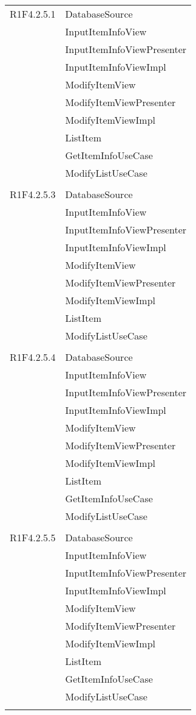 \begin{center}
\begin{longtable}{|p{7cm}|p{7cm}|}
		R1F4.2.5.1 & DatabaseSource \\ & InputItemInfoView \\ & InputItemInfoViewPresenter \\ & InputItemInfoViewImpl \\ & ModifyItemView \\ & ModifyItemViewPresenter \\ & ModifyItemViewImpl \\ & ListItem \\ & GetItemInfoUseCase \\ & ModifyListUseCase \\ & \\ \hline
		R1F4.2.5.3 & DatabaseSource \\ & InputItemInfoView \\ & InputItemInfoViewPresenter \\ & InputItemInfoViewImpl \\ & ModifyItemView \\ & ModifyItemViewPresenter \\ & ModifyItemViewImpl \\ & ListItem \\ & ModifyListUseCase \\ & \\ \hline
		R1F4.2.5.4 & DatabaseSource \\ & InputItemInfoView \\ & InputItemInfoViewPresenter \\ & InputItemInfoViewImpl \\ & ModifyItemView \\ & ModifyItemViewPresenter \\ & ModifyItemViewImpl \\ & ListItem \\ & GetItemInfoUseCase \\ & ModifyListUseCase \\ & \\ \hline
		R1F4.2.5.5 & DatabaseSource \\ & InputItemInfoView \\ & InputItemInfoViewPresenter \\ & InputItemInfoViewImpl \\ & ModifyItemView \\ & ModifyItemViewPresenter \\ & ModifyItemViewImpl \\ & ListItem \\ & GetItemInfoUseCase \\ & ModifyListUseCase \\ & \\ \hline

\end{longtable}
\end{center}
